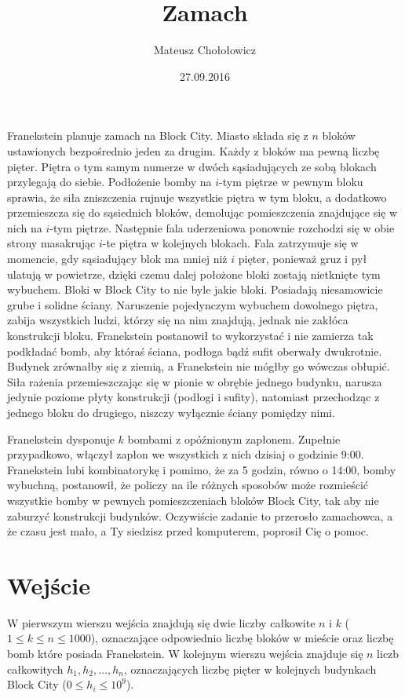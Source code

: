 \documentclass[zad,zawodnik,utf8]{sinol}
\title{Zamach}
\author{Mateusz Chołołowicz} %
\date{27.09.2016}
\begin{document}
  \begin{tasktext}%
Franekstein planuje zamach na Block City. Miasto składa się z $n$ bloków ustawionych bezpośrednio jeden za drugim. Każdy z bloków ma pewną liczbę pięter.
Piętra o tym samym numerze w dwóch sąsiadujących ze sobą blokach przylegają do siebie. Podłożenie bomby na $i$-tym piętrze w pewnym bloku sprawia, 
że siła zniszczenia rujnuje wszystkie piętra w tym bloku, a dodatkowo przemieszcza się do sąsiednich bloków, demolując pomieszczenia znajdujące się 
w nich na $i$-tym piętrze. Następnie fala uderzeniowa ponownie rozchodzi się w obie strony masakrując $i$-te piętra w kolejnych blokach. Fala zatrzymuje się w momencie, gdy
sąsiadujący blok ma mniej niż $i$ pięter, ponieważ gruz i pył ulatują w powietrze, dzięki czemu dalej położone bloki zostają nietknięte tym wybuchem. Bloki w Block City to nie byle jakie bloki. Posiadają niesamowicie grube i solidne ściany.
Naruszenie pojedynczym wybuchem dowolnego piętra, zabija wszystkich ludzi, którzy się na nim znajdują, jednak nie zakłóca konstrukcji bloku. Franekstein postanowił
to wykorzystać i nie zamierza tak podkładać bomb, aby któraś ściana, podłoga bądź sufit oberwały dwukrotnie. Budynek zrównałby się z ziemią, a Franekstein
nie mógłby go wówczas obłupić. Siła rażenia przemieszczając się w pionie w obrębie jednego budynku, narusza jedynie poziome płyty konstrukcji (podłogi i sufity),
natomiast przechodząc z jednego bloku do drugiego, niszczy wyłącznie ściany pomiędzy nimi.

Franekstein dysponuje $k$ bombami z opóźnionym zapłonem. Zupełnie przypadkowo, włączył zapłon we wszystkich z nich dzisiaj o godzinie 9:00. Franekstein
lubi kombinatorykę i pomimo, że za 5 godzin, równo o 14:00, bomby wybuchną, postanowił, że policzy na ile różnych sposobów może rozmieścić wszystkie bomby 
w pewnych pomieszczeniach bloków Block City, tak aby nie zaburzyć konstrukcji budynków. Oczywiście zadanie to przerosło zamachowca, a że czasu jest mało,
a Ty siedzisz przed komputerem, poprosił Cię o pomoc.

 \section{Wejście}
    
W pierwszym wierszu wejścia znajdują się dwie liczby całkowite $n$ i $k$ ($1 \leq k \leq n \leq 1000$), oznaczające odpowiednio liczbę bloków w mieście oraz liczbę 
bomb które posiada Franekstein. W kolejnym wierszu wejścia znajduje się $n$ liczb całkowitych $h_1, h_2, \dots, h_n$, oznaczających liczbę pięter w kolejnych budynkach Block City
($0 \leq h_i \leq 10^9$). 


\end{tasktext}
\end{document}
